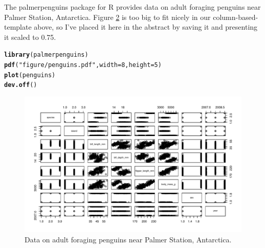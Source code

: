 \documentclass{article}\usepackage[]{graphicx}\usepackage[]{xcolor}
\makeatletter
\newcommand{\hlnum}[1]{\textcolor[rgb]{0.686,0.059,0.569}{#1}}%
\newcommand{\hlsng}[1]{\textcolor[rgb]{0.192,0.494,0.8}{#1}}%
\newcommand{\hldef}[1]{\textcolor[rgb]{0.345,0.345,0.345}{#1}}%
\newcommand{\hlkwc}[1]{\textcolor[rgb]{0.333,0.667,0.333}{#1}}%
\newcommand{\hlkwd}[1]{\textcolor[rgb]{0.737,0.353,0.396}{\textbf{#1}}}%
\newenvironment{kframe}{%
 \def\at@end@of@kframe{}%
 \ifinner\ifhmode%
  \def\at@end@of@kframe{\end{minipage}}%
  \begin{minipage}{\columnwidth}%
 \fi\fi%
 \def\FrameCommand##1{\hskip\@totalleftmargin \hskip-\fboxsep
 \colorbox{shadecolor}{##1}\hskip-\fboxsep
     \hskip-\linewidth \hskip-\@totalleftmargin \hskip\columnwidth}%
 \MakeFramed {\advance\hsize-\width
   \@totalleftmargin\z@ \linewidth\hsize
   \@setminipage}}%
 {\par\unskip\endMakeFramed%
 \at@end@of@kframe}
\newenvironment{knitrout}{}{} %
\makeatother
\begin{document}
The palmerpenguins package for R \citep{palmerpenguins} provides data on adult foraging penguins near Palmer Station, Antarctica. Figure \href{figure2.tab}{2} is too big to fit nicely in our column-based-template above, so I’ve placed it here in the abstract by saving it and presenting it scaled to 0.75.
\begin{knitrout}\scriptsize
{}\color{fgcolor}\begin{kframe}
\begin{alltt}
\hlkwd{library}\hldef{(palmerpenguins)}
\hlkwd{pdf}\hldef{(}\hlsng{"figure/penguins.pdf"}\hldef{,} \hlkwc{width} \hldef{=} \hlnum{8}\hldef{,} \hlkwc{height} \hldef{=} \hlnum{5}\hldef{)}
\hlkwd{plot}\hldef{(penguins)}
\hlkwd{dev.off}\hldef{()}
\end{alltt}
\end{kframe}
\end{knitrout}
\begin{figure}[H]
  \begin{center}
    \includegraphics[scale=0.75]{figure/penguins.pdf}
    \caption{Data on adult foraging penguins near Palmer Station, Antarctica.}
    \label{figure2.tab}
  \end{center}
\end{figure}
\end{document}
